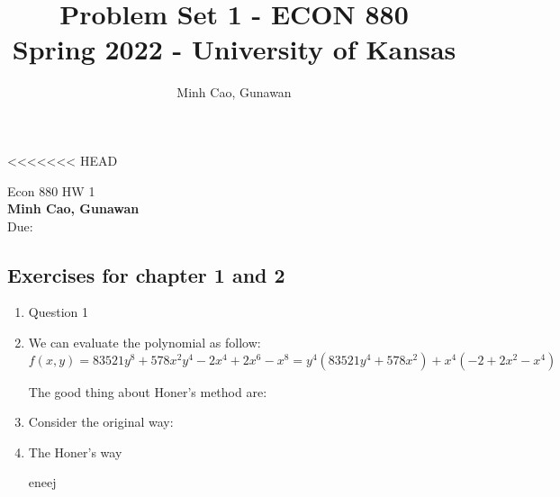 \documentclass[11pt]{article}
\title{Problem Set 1 - ECON 880\\
	\small Spring 2022 - University of Kansas}
\author{Minh Cao, Gunawan}
\newcommand{\1}{\mathbbm{1}}
\begin{document}
<<<<<<< HEAD


\begin{center}
{\Large Econ 880 \hspace{0.5cm} HW 1}\\
\textbf{Minh Cao, Gunawan}\\ %
Due:  %
\end{center}

\vspace{0.2 cm}


\subsection*{Exercises for chapter 1 and 2}

\begin{enumerate}
\item Question 1 
\item We can evaluate the polynomial as follow:\\

 $$ f(x,y) = 83521y^8+578x^{2}y^{4} -2x^{4}+2x^{6}-x^{8} = y^{4}(83521y^{4}+578x^{2})+x^{4}(-2+2x^{2}-x^{4})$$
 
 The good thing about Honer's method are:\\
 
 \item Consider the original way:
 \item The Honer's way

eneej


\end{enumerate}
\end{document}
